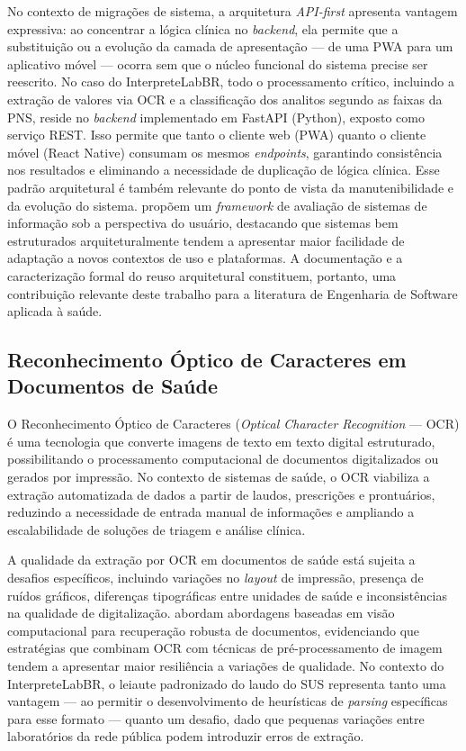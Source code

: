 \documentclass[12pt]{article}
\begin{document}
No contexto de migrações de sistema, a arquitetura \textit{API-first}
apresenta vantagem expressiva: ao concentrar a lógica clínica no
\textit{backend}, ela permite que a substituição ou a evolução da camada de
apresentação — de uma PWA para um aplicativo móvel — ocorra sem que o
núcleo funcional do sistema precise ser reescrito. No caso do
InterpreteLabBR, todo o processamento crítico, incluindo a extração de
valores via OCR e a classificação dos analitos segundo as faixas da PNS,
reside no \textit{backend} implementado em FastAPI (Python), exposto como
serviço REST. Isso permite que tanto o cliente web (PWA) quanto o cliente
móvel (React Native) consumam os mesmos \textit{endpoints}, garantindo
consistência nos resultados e eliminando a necessidade de duplicação de
lógica clínica. Esse padrão arquitetural é também relevante do ponto de
vista da manutenibilidade e da evolução do sistema. \cite{rampinelli2026}
propõem um \textit{framework} de avaliação de sistemas de informação sob a
perspectiva do usuário, destacando que sistemas bem estruturados
arquiteturalmente tendem a apresentar maior facilidade de adaptação a novos
contextos de uso e plataformas. A documentação e a caracterização formal do
reuso arquitetural constituem, portanto, uma contribuição relevante deste
trabalho para a literatura de Engenharia de Software aplicada à saúde.

\subsection{Reconhecimento Óptico de Caracteres em Documentos de Saúde}

O Reconhecimento Óptico de Caracteres (\textit{Optical Character Recognition}
— OCR) é uma tecnologia que converte imagens de texto em texto digital
estruturado, possibilitando o processamento computacional de documentos
digitalizados ou gerados por impressão. No contexto de sistemas de saúde,
o OCR viabiliza a extração automatizada de dados a partir de laudos,
prescrições e prontuários, reduzindo a necessidade de entrada manual de
informações e ampliando a escalabilidade de soluções de triagem e análise
clínica.

A qualidade da extração por OCR em documentos de saúde está sujeita a
desafios específicos, incluindo variações no \textit{layout} de impressão,
presença de ruídos gráficos, diferenças tipográficas entre unidades de saúde
e inconsistências na qualidade de digitalização. \cite{most2025} abordam
abordagens baseadas em visão computacional para recuperação robusta de
documentos, evidenciando que estratégias que combinam OCR com técnicas de
pré-processamento de imagem tendem a apresentar maior resiliência a variações
de qualidade. No contexto do InterpreteLabBR, o leiaute padronizado do laudo
do SUS representa tanto uma vantagem — ao permitir o desenvolvimento de
heurísticas de \textit{parsing} específicas para esse formato — quanto um
desafio, dado que pequenas variações entre laboratórios da rede pública podem
introduzir erros de extração.
\end{document}
